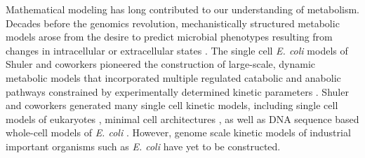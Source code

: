 \documentclass[12pt]{article}
\begin{document}
Mathematical modeling has long contributed to our understanding of metabolism.
Decades before the genomics revolution, mechanistically structured metabolic models arose from the desire to predict microbial phenotypes resulting from changes in intracellular or extracellular states \citep{1976_fredrickson_BiotechBioeng}.
The single cell \textit{E. coli} models of Shuler and coworkers pioneered the construction of large-scale, dynamic metabolic models that incorporated multiple regulated catabolic and anabolic pathways constrained by experimentally determined kinetic parameters \citep{1984_domach_shuler_BiotechBioeng_01}.
Shuler and coworkers generated many single cell kinetic models, including single cell models of eukaryotes \citep{1989_steinmeyer_shuler_ChemEngSci,1992_wu_shuler_AnnNYAcadSci}, minimal cell architectures \citep{2004_castellanos_shuler_PNAS}, as well as DNA sequence based whole-cell models of \textit{E. coli} \citep{2008_atlas_shuler_IETSysBio}.
However, genome scale kinetic models of industrial important organisms such as \textit{E. coli} have yet to be constructed.
\end{document}

